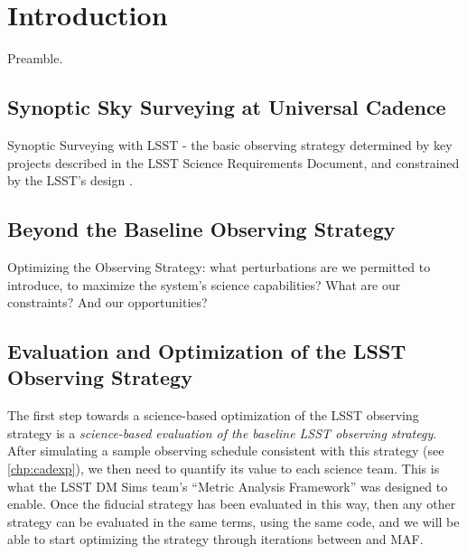 
\chapter[Introduction]{Introduction}
\def\chpname{intro}\label{chp:\chpname}


Preamble.


\section{Synoptic Sky Surveying at Universal Cadence}
\def\secname{intro:baseline}\label{sec:\secname}

Synoptic Surveying with LSST - the basic observing strategy determined
by key projects described in the LSST Science Requirements Document,
and constrained by the LSST's design \citep{IvezicEtal2008}.


\section{Beyond the Baseline Observing Strategy}
\def\secname{intro:baseline}\label{sec:\secname}

Optimizing the Observing Strategy: what perturbations are we
permitted to introduce, to maximize the system's science capabilities?
What are our constraints? And our opportunities?


\section{Evaluation and Optimization of the LSST Observing Strategy}
\def\secname{intro:evaluation}\label{sec:\secname}

The first step towards a science-based optimization of the LSST
observing strategy is a {\it science-based evaluation of the baseline
LSST observing strategy}. After simulating a sample  observing
schedule consistent with this strategy (see  \autoref{chp:cadexp}), we
then need to quantify its value to each science team. This is what the
LSST DM Sims team's ``Metric Analysis Framework''  was designed to
enable. Once the fiducial strategy has been evaluated in this way,
then any other strategy can be evaluated in the same terms, using the
same code, and we will be able to start optimizing the strategy
through iterations between \OpSim and MAF.

